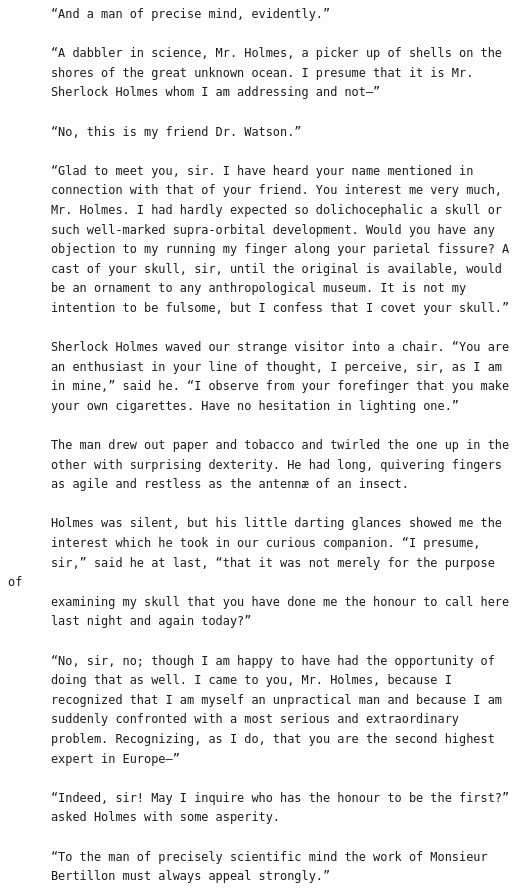 \documentclass{article}
\begin{document}
\begin{verbatim}
      “And a man of precise mind, evidently.”

      “A dabbler in science, Mr. Holmes, a picker up of shells on the
      shores of the great unknown ocean. I presume that it is Mr.
      Sherlock Holmes whom I am addressing and not—”

      “No, this is my friend Dr. Watson.”

      “Glad to meet you, sir. I have heard your name mentioned in
      connection with that of your friend. You interest me very much,
      Mr. Holmes. I had hardly expected so dolichocephalic a skull or
      such well-marked supra-orbital development. Would you have any
      objection to my running my finger along your parietal fissure? A
      cast of your skull, sir, until the original is available, would
      be an ornament to any anthropological museum. It is not my
      intention to be fulsome, but I confess that I covet your skull.”

      Sherlock Holmes waved our strange visitor into a chair. “You are
      an enthusiast in your line of thought, I perceive, sir, as I am
      in mine,” said he. “I observe from your forefinger that you make
      your own cigarettes. Have no hesitation in lighting one.”

      The man drew out paper and tobacco and twirled the one up in the
      other with surprising dexterity. He had long, quivering fingers
      as agile and restless as the antennæ of an insect.

      Holmes was silent, but his little darting glances showed me the
      interest which he took in our curious companion. “I presume,
      sir,” said he at last, “that it was not merely for the purpose of
      examining my skull that you have done me the honour to call here
      last night and again today?”

      “No, sir, no; though I am happy to have had the opportunity of
      doing that as well. I came to you, Mr. Holmes, because I
      recognized that I am myself an unpractical man and because I am
      suddenly confronted with a most serious and extraordinary
      problem. Recognizing, as I do, that you are the second highest
      expert in Europe—”

      “Indeed, sir! May I inquire who has the honour to be the first?”
      asked Holmes with some asperity.

      “To the man of precisely scientific mind the work of Monsieur
      Bertillon must always appeal strongly.”


\end{verbatim}
\end{document}
